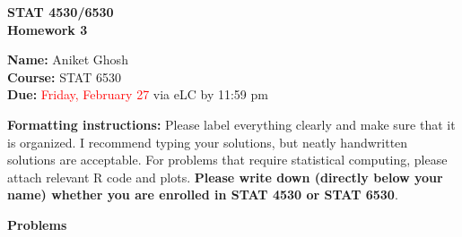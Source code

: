 \documentclass[12pt,letterpaper]{article}
\begin{document}
\large
\begin{center} 
\textbf{STAT 4530/6530}\\[1ex]
\textbf{Homework 3}
\end{center}

\vspace{4mm}
\normalsize
\textbf{Name:} Aniket Ghosh\\
\textbf{Course:} STAT 6530\\
\textbf{Due:} \textcolor{red}{Friday, February 27} via eLC by 11:59 pm

\vspace{4mm}
\textbf{Formatting instructions:} Please label everything clearly and make sure that it is organized. I recommend typing your solutions, but neatly handwritten solutions are acceptable. For problems that require statistical computing, please attach relevant R code and plots. \textbf{Please write down (directly below your name) whether you are enrolled in STAT 4530 or STAT 6530}.

\vspace{4mm}

\textbf{Problems}

\noindent 
\end{document}
